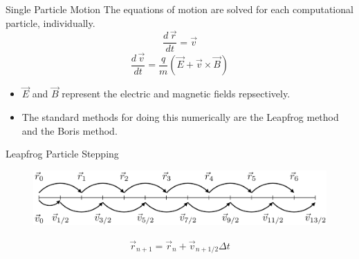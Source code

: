 \documentclass[aspectratio=169, 16pt]{beamer}
\newcommand{\diff}[2]{
    \frac{d #1}{d #2}
}
\begin{document}
\begin{frame}{Single Particle Motion}
  \vfill{}
  \centering
  The equations of motion are solved for each computational particle, individually.
    \centering
      \begin{equation*}
        \diff{\,\vec{r}}{t}
        =
        \vec{v}
      \end{equation*}
      \begin{equation*}
          \diff{\,\vec{v}}{t}
          =
          \frac{q}{m}
          \left(
            \vec{E} +
            \vec{v} \times
            \vec{B}
          \right)
      \end{equation*}
      \begin{itemize}
        \item $\vec{E}$ and $\vec{B}$ represent the electric and magnetic fields repsectively.
        \item The standard methods for doing this numerically are the Leapfrog method and the Boris method.
      \end{itemize}
    
\end{frame}

\begin{frame}{Leapfrog Particle Stepping}
  \vspace{1cm}
  \begin{figure}[H]
    \centering
    \includegraphics[width=\textwidth]{figs/BorisVisualization.png}
  \end{figure}
  \begin{align*}
    \vec{r}_{n+1} = \vec{r}_n + \vec{v}_{n + 1/2} \Delta t
  \end{align*}
\end{frame}
\end{document}
